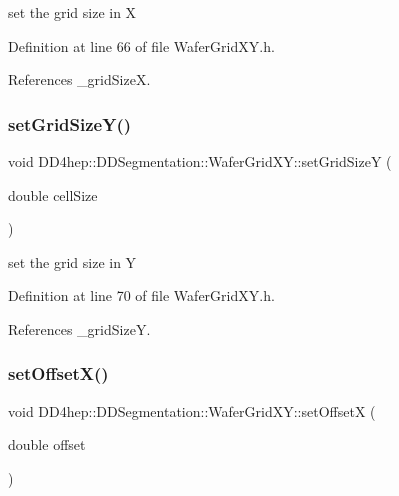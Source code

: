 set the grid size in X 



Definition at line 66 of file Wafer\+Grid\+X\+Y.\+h.



References \+\_\+grid\+SizeX.

\hypertarget{class_d_d4hep_1_1_d_d_segmentation_1_1_wafer_grid_x_y_a8330f514334f70de9b381170c3bcf8ef}{}\label{class_d_d4hep_1_1_d_d_segmentation_1_1_wafer_grid_x_y_a8330f514334f70de9b381170c3bcf8ef} 
\subsubsection{\texorpdfstring{set\+Grid\+Size\+Y()}{setGridSizeY()}}
{\footnotesize\ttfamily void D\+D4hep\+::\+D\+D\+Segmentation\+::\+Wafer\+Grid\+X\+Y\+::set\+Grid\+SizeY (\begin{DoxyParamCaption}\item[{double}]{cell\+Size }\end{DoxyParamCaption})\hspace{0.3cm}{\ttfamily [inline]}}



set the grid size in Y 



Definition at line 70 of file Wafer\+Grid\+X\+Y.\+h.



References \+\_\+grid\+SizeY.

\hypertarget{class_d_d4hep_1_1_d_d_segmentation_1_1_wafer_grid_x_y_a7721c7a200c1893f1badcbc78e1319d8}{}\label{class_d_d4hep_1_1_d_d_segmentation_1_1_wafer_grid_x_y_a7721c7a200c1893f1badcbc78e1319d8} 
\subsubsection{\texorpdfstring{set\+Offset\+X()}{setOffsetX()}}
{\footnotesize\ttfamily void D\+D4hep\+::\+D\+D\+Segmentation\+::\+Wafer\+Grid\+X\+Y\+::set\+OffsetX (\begin{DoxyParamCaption}\item[{double}]{offset }\end{DoxyParamCaption})\hspace{0.3cm}{\ttfamily [inline]}}



